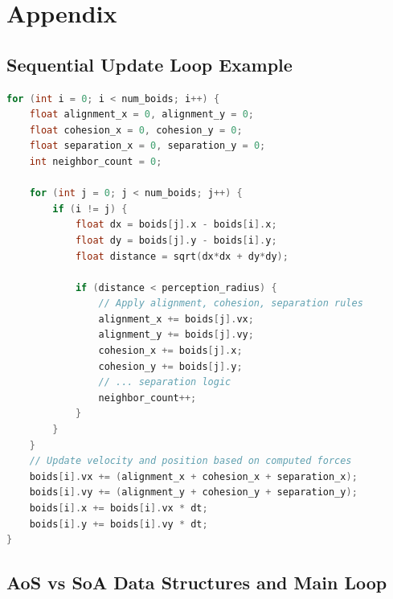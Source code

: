 \documentclass[10pt,twocolumn,letterpaper]{article}
\begin{document}
\appendix
\section*{Appendix}

\subsection*{Sequential Update Loop Example}
\label{appendix:seqcode}
\begin{lstlisting}[language=C++, caption=Sequential Boids update loop structure]
for (int i = 0; i < num_boids; i++) {
    float alignment_x = 0, alignment_y = 0;
    float cohesion_x = 0, cohesion_y = 0;
    float separation_x = 0, separation_y = 0;
    int neighbor_count = 0;
    
    for (int j = 0; j < num_boids; j++) {
        if (i != j) {
            float dx = boids[j].x - boids[i].x;
            float dy = boids[j].y - boids[i].y;
            float distance = sqrt(dx*dx + dy*dy);
            
            if (distance < perception_radius) {
                // Apply alignment, cohesion, separation rules
                alignment_x += boids[j].vx;
                alignment_y += boids[j].vy;
                cohesion_x += boids[j].x;
                cohesion_y += boids[j].y;
                // ... separation logic
                neighbor_count++;
            }
        }
    }
    // Update velocity and position based on computed forces
    boids[i].vx += (alignment_x + cohesion_x + separation_x);
    boids[i].vy += (alignment_y + cohesion_y + separation_y);
    boids[i].x += boids[i].vx * dt;
    boids[i].y += boids[i].vy * dt;
}
\end{lstlisting}

\subsection*{AoS vs SoA Data Structures and Main Loop}
\label{appendix:aossoa}
\end{document}
